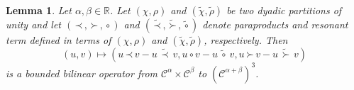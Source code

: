 \documentclass[a4paper,11pt]{article}
\newtheorem{lemma}[theorem]{Lemma}
\theoremstyle{remark}
\newcommand{\R}{\mathbb{R}}
\newcommand{\CC}{\ensuremath{\mathscr{C}}}
\newcommand{\lpara}{\,\mathord{\prec}\,}
\newcommand{\rpara}{\,\mathord{\succ}\,}
\newcommand{\reso}{\,\mathord{\circ}\,}
\begin{document}
\begin{lemma}\label{lem:paraproduct difference is bounded operator}
   Let $\alpha, \beta \in \R$. Let $( \chi, \rho )$ and $( \tilde{\chi}, \tilde{\rho} )$ be two dyadic partitions of unity and %
   let $(\lpara, \rpara, \reso)$ and $(\widetilde{\lpara}, \widetilde{\rpara}, \widetilde{\reso})$ denote paraproducts and resonant term defined in terms of $(\chi, \rho)$ and $(\tilde{\chi}, \tilde{\rho})$, respectively.
Then
   \[
      (u,v) \mapsto ( u \lpara v - u \ \widetilde{\lpara} \ v, u \reso v - u \ \widetilde{\reso} \ v, u \rpara v - u \ \widetilde{\rpara} \ v)
   \]
   is a bounded bilinear operator from $\CC^\alpha \times \CC^\beta$ to $(\CC^{\alpha+\beta})^3$.%
\end{lemma}
\end{document}

